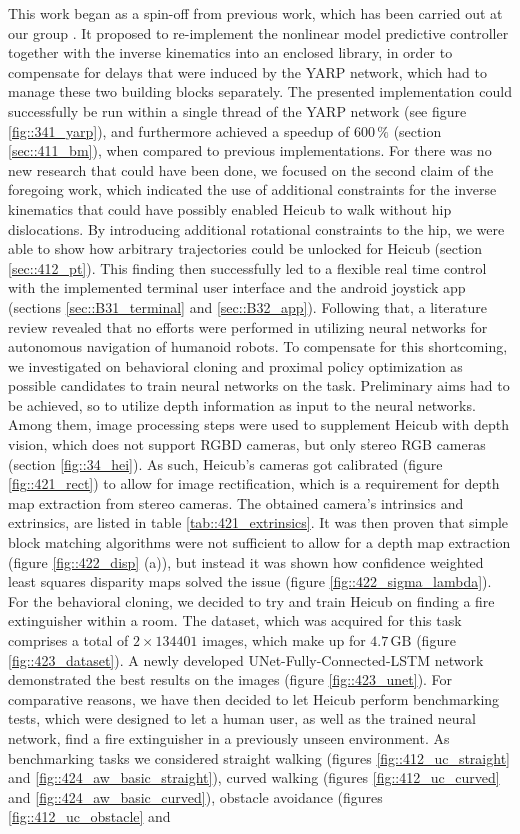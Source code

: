 \label{sec::5_co}
This work began as a spin-off from previous work, which has been carried out at our group \cite{stein2017closed}. It proposed to re-implement the nonlinear model predictive controller together with the inverse kinematics into an enclosed library, in order to compensate for delays that were induced by the YARP network, which had to manage these two building blocks separately. The presented implementation could successfully be run within a single thread of the YARP network (see figure \ref{fig::341_yarp}), and furthermore achieved a speedup of $600\,\%$ (section \ref{sec::411_bm}), when compared to previous implementations. For there was no new research that could have been done, we focused on the second claim of the foregoing work, which indicated the use of additional constraints for the inverse kinematics that could have possibly enabled Heicub to walk without hip dislocations. By introducing additional rotational constraints to the hip, we were able to show how arbitrary trajectories could be unlocked for Heicub (section \ref{sec::412_pt}). This finding then successfully led to a flexible real time control with the implemented terminal user interface and the android joystick app (sections \ref{sec::B31_terminal} and \ref{sec::B32_app}). Following that, a literature review revealed that no efforts were performed in utilizing neural networks for autonomous navigation of humanoid robots. To compensate for this shortcoming, we investigated on behavioral cloning and proximal policy optimization as possible candidates to train neural networks on the task. Preliminary aims had to be achieved, so to utilize depth information as input to the neural networks. Among them, image processing steps were used to supplement Heicub with depth vision, which does not support RGBD cameras, but only stereo RGB cameras (section \ref{fig::34_hei}). As such, Heicub's cameras got calibrated (figure \ref{fig::421_rect}) to allow for image rectification, which is a requirement for depth map extraction from stereo cameras. The obtained camera's intrinsics and extrinsics, are listed in table \ref{tab::421_extrinsics}. It was then proven that simple block matching algorithms were not sufficient to allow for a depth map extraction (figure \ref{fig::422_disp} (a)), but instead it was shown how confidence weighted least squares disparity maps solved the issue (figure \ref{fig::422_sigma_lambda}). For the behavioral cloning, we decided to try and train Heicub on finding a fire extinguisher within a room. The dataset, which was acquired for this task comprises a total of $2\times134401$ images, which make up for $4.7\,\text{GB}$ (figure \ref{fig::423_dataset}). A newly developed UNet-Fully-Connected-LSTM network demonstrated the best results on the images (figure \ref{fig::423_unet}). For comparative reasons, we have then decided to let Heicub perform benchmarking tests, which were designed to let a human user, as well as the trained neural network, find a fire extinguisher in a previously unseen environment. As benchmarking tasks we considered straight walking (figures \ref{fig::412_uc_straight} and \ref{fig::424_aw_basic_straight}), curved walking (figures \ref{fig::412_uc_curved} and \ref{fig::424_aw_basic_curved}), obstacle avoidance (figures \ref{fig::412_uc_obstacle} and 